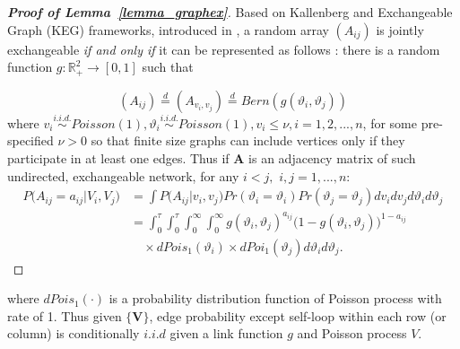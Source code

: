 \documentclass[12pt]{article}
\theoremstyle{definition}
\begin{document}
\begin{proof}[\textbf{Proof of Lemma~\ref{lemma_graphex}}]
	Based on Kallenberg and Exchangeable Graph (KEG) frameworks, introduced in \cite{veitch2015class}, a random array $(A_{ij})$ is jointly exchangeable \textit{if and only if} it can be represented as follows : there is a random function $g : \mathbb{R}^{2}_{+} \rightarrow [0,1]$ such that 
	
	\begin{equation}
	(A_{ij})  \stackrel{d}{=} (A_{v_{i}, v_{j}} )  \stackrel{d}{=} Bern( g( \vartheta_{i}, \vartheta_{j}))
	\end{equation}
	where $v_{i} \overset{i.i.d.}{\sim} Poisson(1), \vartheta_{i} \overset{i.i.d.}{\sim} Poisson(1), v_{i} \leq \nu, i = 1,2,... , n$, for some pre-specified $\nu >0$ so that finite size graphs can include vertices only if they participate in at least one edges. Thus if $\mathbf{A}$ is an adjacency matrix of such undirected, exchangeable network, for any $i < j,$ $i,j = 1,... , n$:
\begin{equation}
\begin{split}
	P \big(  A_{ij} = a_{ij} \big| V_{i}, V_{j} \big) & = \int P \big( A_{ij} \big| v_{i}, v_{j} \big) Pr(\vartheta_{i} = \vartheta_{i}) Pr(\vartheta_{j} = \vartheta_{j})   dv_{i} dv_{j} d\vartheta_{i} d\vartheta_{j}   \\ & = \int_{0}^{\tau} \int_{0}^{\tau}   \int_{0}^{\infty} \int_{0}^{\infty}  g( \vartheta_{i},  \vartheta_{j})^{a_{ij}} \big( 1- g( \vartheta_{i},  \vartheta_{j}) \big)^{1-a_{ij}}  \\ & \quad \times dPois_{1}(\vartheta_{i}) \times dPoi_{1}(\vartheta_{j})  d \vartheta_{i} d \vartheta_{j}.
\end{split}
\end{equation}
\end{proof}
where $dPois_{1}(\cdot)$ is a probability distribution function of Poisson process with rate of 1.  Thus given $\{ \mathbf{V} \}$, edge probability except self-loop within each row (or column) is conditionally $\textit{i.i.d}$ given a link function $g$ and Poisson process $V$.
\end{document}
